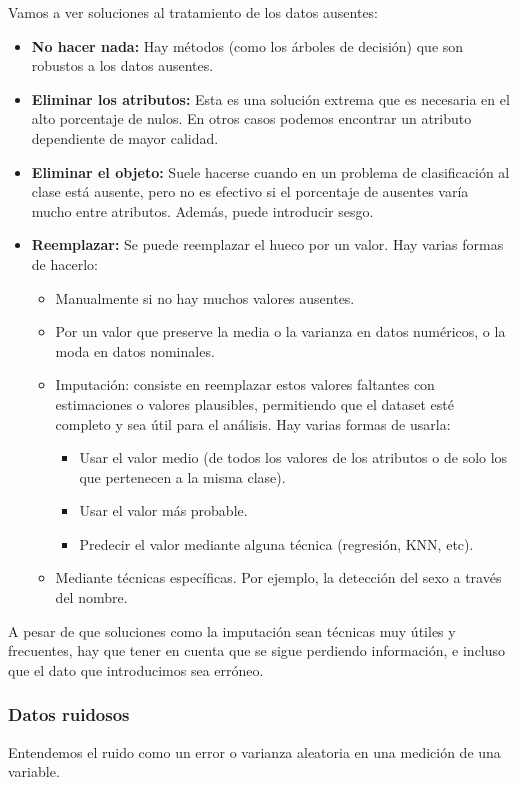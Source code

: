 \documentclass[12pt, letterpaper]{article}
\begin{document}
Vamos a ver soluciones al tratamiento de los datos ausentes:
\begin{itemize}
    \item \textbf{No hacer nada:} Hay métodos (como los árboles de decisión) que son robustos a los datos ausentes.
    \item \textbf{Eliminar los atributos:} Esta es una solución extrema que es necesaria en el alto porcentaje de nulos. En otros casos podemos encontrar un atributo dependiente de mayor calidad.
    \item \textbf{Eliminar el objeto:} Suele hacerse cuando en un problema de clasificación al clase está ausente, pero no es efectivo si el porcentaje de ausentes varía mucho entre atributos. Además, puede introducir sesgo.
    \item \textbf{Reemplazar:} Se puede reemplazar el hueco por un valor. Hay varias formas de hacerlo:
        \begin{itemize}
            \item Manualmente si no hay muchos valores ausentes.
            \item Por un valor que preserve la media o la varianza en datos numéricos, o la moda en datos nominales.
            \item Imputación: consiste en reemplazar estos valores faltantes con estimaciones o valores plausibles, permitiendo que el dataset esté completo y sea útil para el análisis. Hay varias formas de usarla:
                \begin{itemize}
                    \item Usar el valor medio (de todos los valores de los atributos o de solo los que pertenecen a la misma clase).
                    \item Usar el valor más probable.
                    \item Predecir el valor mediante alguna técnica (regresión, KNN, etc).
                \end{itemize}
            \item Mediante técnicas específicas. Por ejemplo, la detección del sexo a través del nombre.
        \end{itemize}
\end{itemize}

A pesar de que soluciones como la imputación sean técnicas muy útiles y frecuentes, hay que tener en cuenta que se sigue perdiendo información, e incluso que el dato que introducimos sea erróneo.

\subsubsection{Datos ruidosos}
Entendemos el ruido como un error o varianza aleatoria en una medición de una variable.
\end{document}
